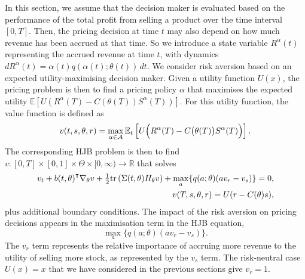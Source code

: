 \documentclass[main.tex]{subfiles}
\begin{document}
In this section, we assume that the decision maker is evaluated based on
the performance of the total profit from selling a product over the
time interval $[0,T]$. Then, the pricing decision at time $t$ may also depend
on how much revenue has been accrued at that time. So we
introduce a state variable $R^\alpha(t)$ representing the accrued
revenue at time $t$, with dynamics
$dR^\alpha(t)=\alpha(t)q(\alpha(t);\theta(t))\,dt$.
We consider risk aversion based on
an expected utility-maximising decision maker.
Given a utility function $U(x)$, the pricing problem is then to
find a pricing policy $\alpha$ that maximises the expected utility
$\mathbb{E}[U(R^\alpha(T)-C(\theta(T))S^\alpha(T))]$.
For this utility function, the value function is defined as
\begin{equation}
  v(t,s,\theta,r)=
  \max_{\alpha\in\mathcal{A}}
  \mathbb{E}_t\left[
    U\Bigl(R^\alpha(T)-C\bigl(\theta(T)\bigr)S^\alpha(T)\Bigr)
  \right].
\end{equation}
The corresponding HJB problem is then to find
$v:{[0,T]}\times{[0,1]}\times \Theta\times{[0,\infty)}\to\mathbb{R}$ that solves
\begin{align}\label{eq:hjb_utility}
  v_t+{b(t,\theta)}^\intercal \nabla_\theta v
  + {\textstyle\frac{1}{2}}\mbox{tr}\left( \Sigma(t,\theta)
  H_\theta v \right)
  +\max_{a}\{q(a;\theta)(av_r-v_s)\}=0&,\\
  v(T,s,\theta,r) = U(r-C(\theta)s)&,
\end{align}
plus additional boundary conditions. The impact of the risk aversion
on pricing decisions appears in the maximisation term in the HJB
equation,
\begin{equation}
  \max_a\{q(a;\theta)(av_r-v_s)\}.
\end{equation}
The $v_r$ term represents
the relative importance of accruing more revenue to the utility of
selling more stock, as represented by the $v_s$ term.
The risk-neutral case $U(x)=x$ that we have considered in the previous
sections give $v_r=1$.
\end{document}
